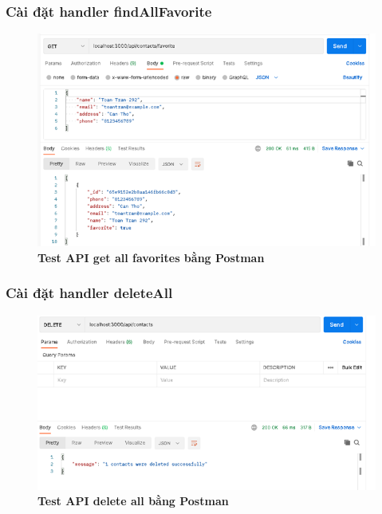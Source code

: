 \subsubsection*{Cài đặt handler findAllFavorite}
\begin{figure}[H]
  \centering
  \includegraphics[width=15cm]{images/chapterSecond/10.png}
  \caption{\bfseries Test API get all favorites bằng Postman}
\end{figure}
\subsubsection*{Cài đặt handler deleteAll}
\begin{figure}[H]
  \centering
  \includegraphics[width=15cm]{images/chapterSecond/11.png}
  \caption{\bfseries Test API delete all bằng Postman}
\end{figure}



